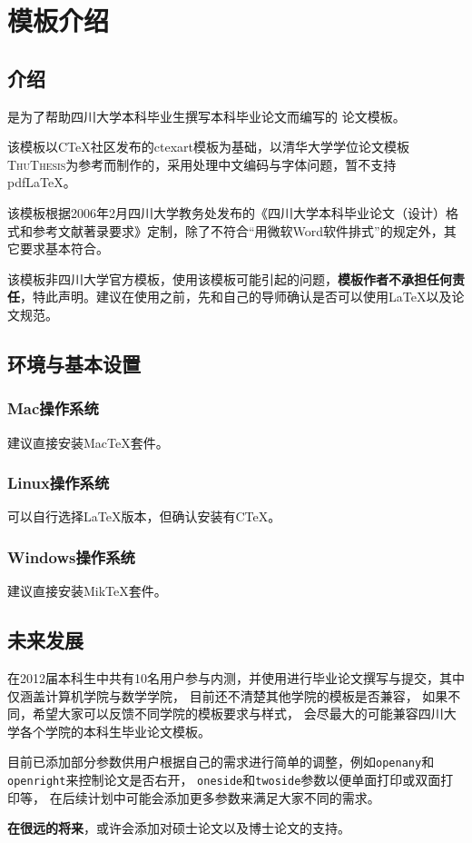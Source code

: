 \chapter{模板介绍}
\section{介绍}
	\scuthesis{}是为了帮助四川大学本科毕业生撰写本科毕业论文而编写的 \LaTeXe{}\citep{knuth_texbook_1986} 论文模板。
	
	该模板以C\TeX{}社区发布的ctexart模板为基础，以清华大学学位论文模板\textsc{ThuThesis}为参考而制作的，采用\XeLaTeX{}处理中文编码与字体问题，暂不支持 pdf\LaTeX{}。
	
	该模板根据2006年2月四川大学教务处发布的《四川大学本科毕业论文（设计）格式和参考文献著录要求》定制，除了不符合“用微软Word软件排式”的规定外，其它要求基本符合。
	
	该模板非四川大学官方模板，使用该模板可能引起的问题，\textbf{模板作者不承担任何责任}，特此声明。建议在使用之前，先和自己的导师确认是否可以使用\LaTeX{}以及论文规范。 
	
\section{环境与基本设置}
\subsection{Mac操作系统}
建议直接安装Mac\TeX{}套件。
\subsection{Linux操作系统}
可以自行选择\LaTeX{}版本，但确认安装有C\TeX{}。
\subsection{Windows操作系统}
建议直接安装Mik\TeX{}套件。

\section{未来发展}
在2012届本科生中共有10名用户参与内测，并使用\scuthesis{}进行毕业论文撰写与提交，其中仅涵盖计算机学院与数学学院，
目前还不清楚其他学院的模板是否兼容，
如果不同，希望大家可以反馈不同学院的模板要求与样式，
\scuthesis{}会尽最大的可能兼容四川大学各个学院的本科生毕业论文模板。

\scuthesis{}目前已添加部分参数供用户根据自己的需求进行简单的调整，例如\texttt{openany}和\texttt{openright}来控制论文是否右开，
\texttt{oneside}和\texttt{twoside}参数以便单面打印或双面打印等，
在后续计划中可能会添加更多参数来满足大家不同的需求。

\textbf{在很远的将来}，\scuthesis{}或许会添加对硕士论文以及博士论文的支持。
